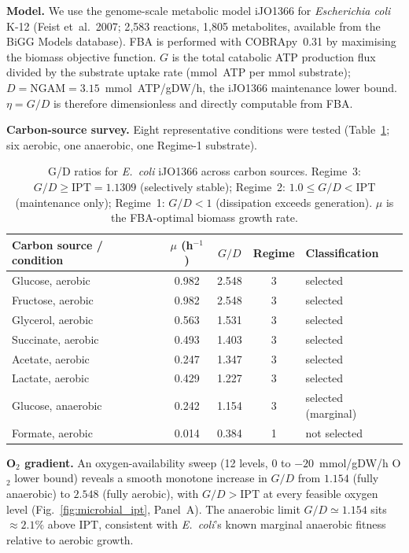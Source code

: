 \documentclass[11pt]{article}
\theoremstyle{remark}
\newcommand{\IPT}{\mathrm{IPT}}
\begin{document}
\noindent\textbf{Model.}
We use the genome-scale metabolic model iJO1366 for \emph{Escherichia coli} K-12
(Feist et~al.\ 2007; 2{,}583 reactions, 1{,}805 metabolites, available from the
BiGG Models database).
FBA is performed with COBRApy~0.31 by maximising the biomass objective function.
$G$ is the total catabolic ATP production flux divided by the substrate uptake
rate (mmol~ATP per mmol substrate);
$D = \mathrm{NGAM} = 3.15$~mmol~ATP/gDW/h, the iJO1366 maintenance lower bound.
$\eta = G/D$ is therefore dimensionless and directly computable from FBA.

\noindent\textbf{Carbon-source survey.}
Eight representative conditions were tested
(Table~\ref{tab:microbial_gd}; six aerobic, one anaerobic, one
Regime-1 substrate).

\begin{table}[ht]
\centering
\small
\begin{tabular}{lcccl}
\hline
\textbf{Carbon source / condition} & $\mu$ (h$^{-1}$) & $G/D$ & \textbf{Regime} & \textbf{Classification} \\
\hline
Glucose, aerobic     & 0.982 & 2.548 & 3 & selected \\
Fructose, aerobic    & 0.982 & 2.548 & 3 & selected \\
Glycerol, aerobic    & 0.563 & 1.531 & 3 & selected \\
Succinate, aerobic   & 0.493 & 1.403 & 3 & selected \\
Acetate, aerobic     & 0.247 & 1.347 & 3 & selected \\
Lactate, aerobic     & 0.429 & 1.227 & 3 & selected \\
Glucose, anaerobic   & 0.242 & 1.154 & 3 & selected (marginal) \\
Formate, aerobic     & 0.014 & 0.384 & 1 & not selected \\
\hline
\end{tabular}
\caption{G/D ratios for \emph{E.~coli} iJO1366 across carbon sources.
Regime~3: $G/D \geq \IPT = 1.1309$ (selectively stable);
Regime~2: $1.0 \leq G/D < \IPT$ (maintenance only);
Regime~1: $G/D < 1$ (dissipation exceeds generation).
$\mu$ is the FBA-optimal biomass growth rate.}
\label{tab:microbial_gd}
\end{table}

\noindent\textbf{O$_2$ gradient.}
An oxygen-availability sweep (12 levels, $0$ to $-20$~mmol/gDW/h O$_2$ lower bound)
reveals a smooth monotone increase in $G/D$ from $1.154$ (fully anaerobic)
to $2.548$ (fully aerobic), with $G/D > \IPT$ at every feasible oxygen level
(Fig.~\ref{fig:microbial_ipt}, Panel~A).
The anaerobic limit $G/D \simeq 1.154$ sits $\approx 2.1\%$ above $\IPT$,
consistent with \emph{E.~coli}'s known marginal anaerobic fitness relative to
aerobic growth.
\end{document}
